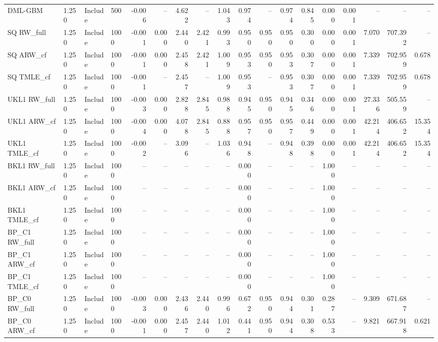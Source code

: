 \begin{tabular}{llllrrrrrrrrrrrrrr}
DML-GBM & 1.250 & Include & 500 & -0.006 & -- & 4.622 & -- & 1.043 & 0.974 & -- & 0.974 & 0.845 & 0.000 & 0.001 & -- & -- & -- \\
SQ RW\_full & 1.250 & Include & 1000 & -0.001 & 0.000 & 2.440 & 2.421 & 0.993 & 0.950 & 0.950 & 0.950 & 0.300 & 0.000 & 0.001 & 7.070 & 707.392 & -- \\
SQ ARW\_cf & 1.250 & Include & 1000 & -0.001 & 0.000 & 2.458 & 2.421 & 1.009 & 0.953 & 0.950 & 0.953 & 0.307 & 0.000 & 0.001 & 7.339 & 702.959 & 0.678 \\
SQ TMLE\_cf & 1.250 & Include & 1000 & -0.001 & -- & 2.457 & -- & 1.009 & 0.953 & -- & 0.953 & 0.307 & 0.000 & 0.001 & 7.339 & 702.959 & 0.678 \\
UKL1 RW\_full & 1.250 & Include & 1000 & -0.003 & 0.000 & 2.828 & 2.845 & 0.988 & 0.945 & 0.950 & 0.945 & 0.346 & 0.000 & 0.001 & 27.336 & 505.559 & -- \\
UKL1 ARW\_cf & 1.250 & Include & 1000 & -0.004 & 0.000 & 4.078 & 2.845 & 0.888 & 0.957 & 0.950 & 0.957 & 0.449 & 0.000 & 0.001 & 42.214 & 406.652 & 15.354 \\
UKL1 TMLE\_cf & 1.250 & Include & 1000 & -0.002 & -- & 3.096 & -- & 1.036 & 0.948 & -- & 0.948 & 0.398 & 0.000 & 0.001 & 42.214 & 406.652 & 15.354 \\
BKL1 RW\_full & 1.250 & Include & 1000 & -- & -- & -- & -- & -- & 0.000 & -- & -- & -- & 1.000 & -- & -- & -- & -- \\
BKL1 ARW\_cf & 1.250 & Include & 1000 & -- & -- & -- & -- & -- & 0.000 & -- & -- & -- & 1.000 & -- & -- & -- & -- \\
BKL1 TMLE\_cf & 1.250 & Include & 1000 & -- & -- & -- & -- & -- & 0.000 & -- & -- & -- & 1.000 & -- & -- & -- & -- \\
BP\_C1 RW\_full & 1.250 & Include & 1000 & -- & -- & -- & -- & -- & 0.000 & -- & -- & -- & 1.000 & -- & -- & -- & -- \\
BP\_C1 ARW\_cf & 1.250 & Include & 1000 & -- & -- & -- & -- & -- & 0.000 & -- & -- & -- & 1.000 & -- & -- & -- & -- \\
BP\_C1 TMLE\_cf & 1.250 & Include & 1000 & -- & -- & -- & -- & -- & 0.000 & -- & -- & -- & 1.000 & -- & -- & -- & -- \\
BP\_C0 RW\_full & 1.250 & Include & 1000 & -0.003 & 0.000 & 2.436 & 2.440 & 0.996 & 0.672 & 0.950 & 0.944 & 0.301 & 0.287 & -- & 9.309 & 671.687 & -- \\
BP\_C0 ARW\_cf & 1.250 & Include & 1000 & -0.001 & 0.000 & 2.457 & 2.440 & 1.012 & 0.441 & 0.950 & 0.944 & 0.308 & 0.533 & -- & 9.821 & 667.918 & 0.621 \\

\end{tabular}
